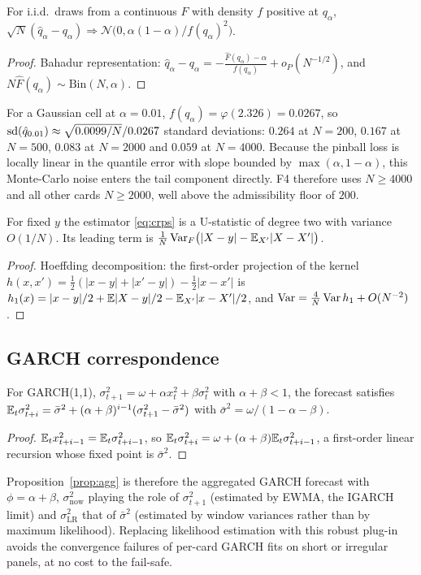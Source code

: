\begin{proposition}
For i.i.d.\ draws from a continuous $F$ with density $f$ positive at $q_\alpha$,
$\sqrt N(\hat q_\alpha-q_\alpha)\Rightarrow\mathcal N\bigl(0,\alpha(1-\alpha)/f(q_\alpha)^2\bigr)$.
\end{proposition}
\begin{proof}
Bahadur representation: $\hat q_\alpha-q_\alpha=-\frac{\hat F(q_\alpha)-\alpha}{f(q_\alpha)}+o_P(N^{-1/2})$, and $N\hat F(q_\alpha)\sim\mathrm{Bin}(N,\alpha)$.
\end{proof}
For a Gaussian cell at $\alpha=0.01$, $f(q_\alpha)=\varphi(2.326)=0.0267$, so $\operatorname{sd}(\hat q_{0.01})\approx\sqrt{0.0099/N}/0.0267$ standard deviations:
$0.264$ at $N=200$, $0.167$ at $N=500$, $0.083$ at $N=2000$ and $0.059$ at $N=4000$. Because the pinball loss is locally linear in the quantile
error with slope bounded by $\max(\alpha,1-\alpha)$, this Monte-Carlo noise enters the tail component directly. F4 therefore uses
$N\ge4000$ and all other cards $N\ge2000$, well above the admissibility floor of $200$.

\begin{proposition}
For fixed $y$ the estimator \eqref{eq:crps} is a U-statistic of degree two with variance $O(1/N)$. Its leading term is
$\frac{1}{N}\operatorname{Var}_F\bigl(|X-y|-\mathbb{E}_{X'}|X-X'|\bigr)$.
\end{proposition}
\begin{proof}
Hoeffding decomposition: the first-order projection of the kernel $h(x,x')=\frac12(|x-y|+|x'-y|)-\frac12|x-x'|$ is
$h_1(x)=|x-y|/2+\mathbb{E}|X-y|/2-\mathbb{E}_{X'}|x-X'|/2$, and $\operatorname{Var}=\frac{4}{N}\operatorname{Var} h_1+O(N^{-2})$.
\end{proof}

\subsection{GARCH correspondence}

\begin{proposition}
For GARCH(1,1), $\sigma^2_{t+1}=\omega+\alpha x_t^2+\beta\sigma^2_t$ with $\alpha+\beta<1$, the forecast satisfies
$\mathbb{E}_t\sigma^2_{t+i}=\bar\sigma^2+(\alpha+\beta)^{i-1}(\sigma^2_{t+1}-\bar\sigma^2)$ with $\bar\sigma^2=\omega/(1-\alpha-\beta)$.
\end{proposition}
\begin{proof}
$\mathbb{E}_t x^2_{t+i-1}=\mathbb{E}_t\sigma^2_{t+i-1}$, so $\mathbb{E}_t\sigma^2_{t+i}=\omega+(\alpha+\beta)\mathbb{E}_t\sigma^2_{t+i-1}$, a first-order linear recursion whose fixed
point is $\bar\sigma^2$.
\end{proof}
Proposition~\ref{prop:agg} is therefore the aggregated GARCH forecast with $\phi=\alpha+\beta$, $\sigma^2_{\text{now}}$ playing the role of
$\sigma^2_{t+1}$ (estimated by EWMA, the IGARCH limit) and $\sigma^2_{\mathrm{LR}}$ that of $\bar\sigma^2$ (estimated by window variances rather
than by maximum likelihood). Replacing likelihood estimation with this robust plug-in avoids the convergence failures of per-card GARCH fits on
short or irregular panels, at no cost to the fail-safe.


